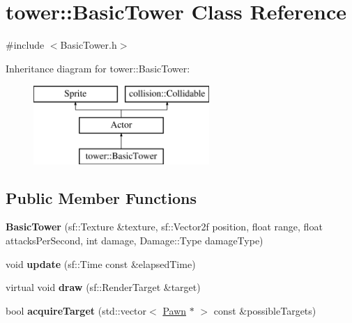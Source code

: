 \hypertarget{classtower_1_1_basic_tower}{}\section{tower\+:\+:Basic\+Tower Class Reference}
\label{classtower_1_1_basic_tower}


{\ttfamily \#include $<$Basic\+Tower.\+h$>$}

Inheritance diagram for tower\+:\+:Basic\+Tower\+:\begin{figure}[H]
\begin{center}
\leavevmode
\includegraphics[height=3.000000cm]{classtower_1_1_basic_tower}
\end{center}
\end{figure}
\subsection*{Public Member Functions}
\begin{DoxyCompactItemize}
\item 
\hypertarget{classtower_1_1_basic_tower_ad47cda8c34a98257c5cbd0ba9dfab163}{}{\bfseries Basic\+Tower} (sf\+::\+Texture \&texture, sf\+::\+Vector2f position, float range, float attacks\+Per\+Second, int damage, Damage\+::\+Type damage\+Type)\label{classtower_1_1_basic_tower_ad47cda8c34a98257c5cbd0ba9dfab163}

\item 
\hypertarget{classtower_1_1_basic_tower_aa8363905f0305f60ffba028c393e6098}{}void {\bfseries update} (sf\+::\+Time const \&elapsed\+Time)\label{classtower_1_1_basic_tower_aa8363905f0305f60ffba028c393e6098}

\item 
\hypertarget{classtower_1_1_basic_tower_a180cb7c32e45fed8e4d4476fd6e2d7ce}{}virtual void {\bfseries draw} (sf\+::\+Render\+Target \&target)\label{classtower_1_1_basic_tower_a180cb7c32e45fed8e4d4476fd6e2d7ce}

\item 
\hypertarget{classtower_1_1_basic_tower_a80cb558b7d52b02708e4661b486311b6}{}bool {\bfseries acquire\+Target} (std\+::vector$<$ \hyperlink{class_pawn}{Pawn} $\ast$ $>$ const \&possible\+Targets)\label{classtower_1_1_basic_tower_a80cb558b7d52b02708e4661b486311b6}

\end{DoxyCompactItemize}
